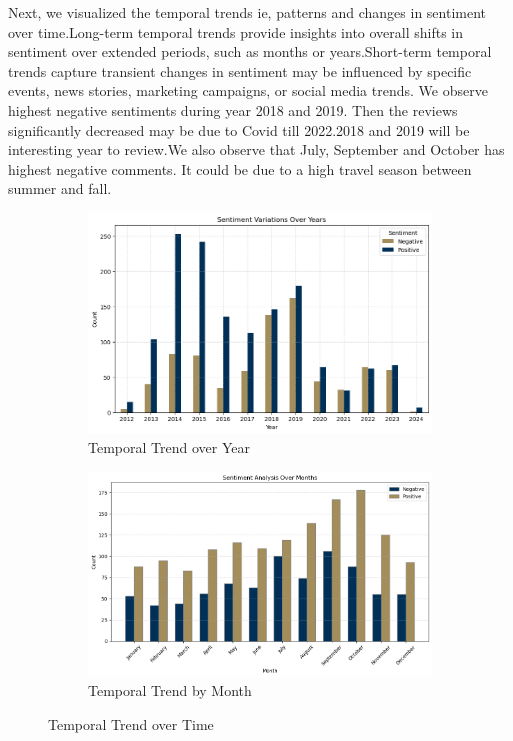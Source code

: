 \documentclass[11pt]{article} %
\begin{document}
Next, we visualized the temporal trends ie, patterns and changes in sentiment over time.Long-term temporal trends provide insights into overall shifts in sentiment over extended periods, such as months or years.Short-term temporal trends capture transient changes in sentiment may be influenced by specific events, news stories, marketing campaigns, or social media trends. We observe highest negative sentiments during year 2018 and 2019. Then the reviews significantly decreased may be due to Covid till 2022.2018 and 2019 will be interesting year to review.We also observe that July, September and October has highest negative comments. It could be due to a high travel season between summer and fall.
\begin{figure}[H]
  \centering
  \begin{subfigure}[b]{0.45\textwidth}
    \includegraphics[width=\textwidth]{images/sentiment_variation_over_year.png}
    \caption{Temporal Trend over Year}
    \label{fig:Temporal Trend over Year}
  \end{subfigure}
  \hfill
  \begin{subfigure}[b]{0.45\textwidth}
    \includegraphics[width=\textwidth]{images/sentiment_variation_over_month.png}
    \caption{Temporal Trend by Month}
    \label{fig:Temporal Trend by Month}
  \end{subfigure}
  \caption{Temporal Trend over Time}
  \label{fig:twosidebyside}
\end{figure}
\end{document}
